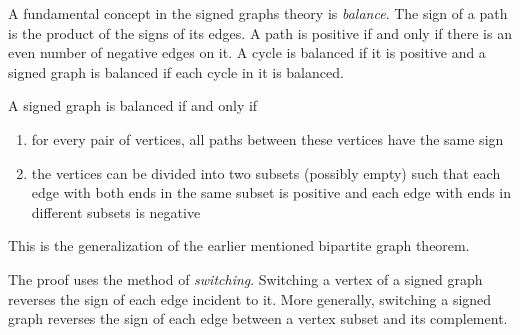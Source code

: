 A fundamental concept in the signed graphs theory is \textit{balance}. The sign of a path is the product of the signs of its edges. A path is positive if and only if there is an even number of negative edges on it. A cycle is balanced if it is positive and a signed graph is balanced if each cycle in it is balanced\cite{harary}.

\begin{theorem}[Harary]\label{th:harary}
    A signed graph is balanced if and only if
    \begin{enumerate}
        \item for every pair of vertices, all paths between these vertices have the same sign
        \item the vertices can be divided into two subsets (possibly empty) such that each edge with both ends in the same subset is positive and each edge with ends in different subsets is negative
    \end{enumerate}

    This is the generalization of the earlier mentioned bipartite graph theorem.
\end{theorem}

The proof uses the method of \textit{switching}. Switching a vertex of a signed graph reverses the sign of each edge incident to it. More generally, switching a signed graph reverses the sign of each edge between a vertex subset and its complement.

